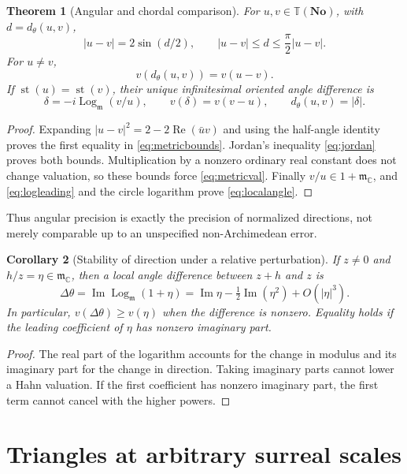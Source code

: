 \documentclass[11pt]{article}
\numberwithin{equation}{section}
\newtheorem{theorem}{Theorem}[section]
\newtheorem{corollary}[theorem]{Corollary}
\theoremstyle{definition}
\newcommand{\No}{\mathbf{No}}
\newcommand{\C}{\mathbb C}
\newcommand{\mm}{\mathfrak m}
\newcommand{\TT}{\mathbb T}
\newcommand{\st}{\operatorname{st}}
\newcommand{\re}{\operatorname{Re}}
\newcommand{\im}{\operatorname{Im}}
\newcommand{\Logm}{\operatorname{Log}_{\mm}}
\begin{document}
\begin{theorem}[Angular and chordal comparison]\label{thm:metric}
For $u,v\in\TT(\No)$, with $d=d_\theta(u,v)$,
\begin{equation}\label{eq:metricbounds}
 |u-v|=2\sin(d/2),\qquad
 |u-v|\le d\le\frac\pi2|u-v|.
\end{equation}
For $u\ne v$,
\begin{equation}\label{eq:metricval}
 v(d_\theta(u,v))=v(u-v).
\end{equation}
If $\st(u)=\st(v)$, their unique infinitesimal oriented angle difference is
\begin{equation}\label{eq:localangle}
 \delta=-i\Logm(v/u),\qquad
 v(\delta)=v(v-u),\qquad d_\theta(u,v)=|\delta|.
\end{equation}
\end{theorem}
\begin{proof}
Expanding $|u-v|^2=2-2\re(\bar uv)$ and using the half-angle identity proves the first equality in \eqref{eq:metricbounds}. Jordan's inequality \eqref{eq:jordan} proves both bounds. Multiplication by a nonzero ordinary real constant does not change valuation, so these bounds force \eqref{eq:metricval}. Finally $v/u\in1+\mm_{\C}$, and \eqref{eq:logleading} and the circle logarithm prove \eqref{eq:localangle}.
\end{proof}
Thus angular precision is exactly the precision of normalized directions, not merely comparable up to an unspecified non-Archimedean error.

\begin{corollary}[Stability of direction under a relative perturbation]\label{cor:directionstability}
If $z\ne0$ and $h/z=\eta\in\mm_{\C}$, then a local angle difference between $z+h$ and $z$ is
\[
 \Delta\theta=\im\Logm(1+\eta)
 =\im\eta-\tfrac12\im(\eta^2)+O(|\eta|^3).
\]
In particular, $v(\Delta\theta)\ge v(\eta)$ when the difference is nonzero. Equality holds if the leading coefficient of $\eta$ has nonzero imaginary part.
\end{corollary}
\begin{proof}
The real part of the logarithm accounts for the change in modulus and its imaginary part for the change in direction. Taking imaginary parts cannot lower a Hahn valuation. If the first coefficient has nonzero imaginary part, the first term cannot cancel with the higher powers.
\end{proof}

\section{Triangles at arbitrary surreal scales}\label{sec:triangles}
\end{document}
